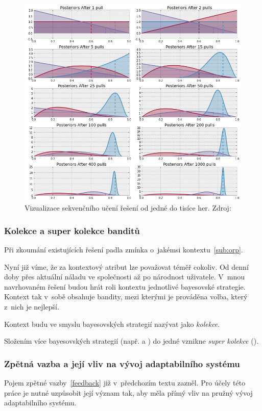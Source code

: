 \documentclass[thesis=M,czech]{FITthesis}[2014/05/07]
\begin{document}
\begin{figure}\centering
	\includegraphics[width=1.0\textwidth]{obr/posteriors.png}
 	\caption[Vizualizace sekvenčního učení řešení od jedné do tisíce her.]{Vizualizace sekvenčního učení řešení od jedné do tisíce her. Zdroj: \cite{camdp}}\label{fig:posteriors}
\end{figure}	

\subsubsection{Kolekce a super kolekce banditů}
Při zkoumání existujících řešení padla zmínka o~jakémsi kontextu~\ref {sub:orp}.

Nyní již víme, že za kontextový atribut lze považovat téměř cokoliv. Od denní doby přes aktuální náladu ve společnosti až po národnost uživatele. V~mnou navrhovaném řešení budou hrát roli kontextu jednotlivé bayesovské strategie. Kontext tak v~sobě obsahuje bandity, mezi kterými je prováděna volba, který z~nich je nejlepší. 

Kontext budu ve smyslu bayesovských strategií nazývat jako \emph{kolekce}.

Složením více bayesovských strategií (např.  a ) do jedné vznikne \emph{super kolekce} (). 

\subsubsection{Zpětná vazba a její vliv na vývoj adaptabilního systému}
\label{subsub:feedback}
Pojem zpětné vazby~\ref{feedback} již v~předchozím textu zazněl. Pro účely této práce je nutné uzpůsobit její význam tak, aby měla přímý vliv na pružný vývoj adaptabilního systému.
\end{document}
